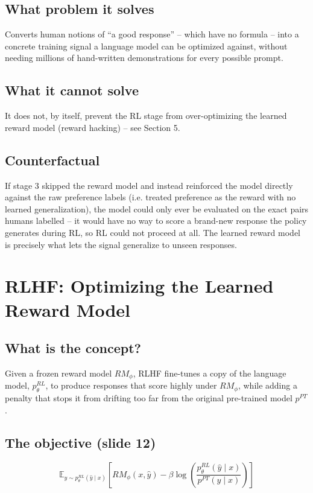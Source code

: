 \documentclass[11pt]{article}
\begin{document}
\subsection{What problem it solves}
Converts human notions of ``a good response'' -- which have no formula -- into a
concrete training signal a language model can be optimized against, without
needing millions of hand-written demonstrations for every possible prompt.

\subsection{What it cannot solve}
It does not, by itself, prevent the RL stage from over-optimizing the learned
reward model (reward hacking) -- see Section 5.

\subsection{Counterfactual}
If stage 3 skipped the reward model and instead reinforced the model directly
against the raw preference labels (i.e. treated preference as the reward with no
learned generalization), the model could only ever be evaluated on the exact
pairs humans labelled -- it would have no way to score a brand-new response the
policy generates during RL, so RL could not proceed at all. The learned reward
model is precisely what lets the signal generalize to unseen responses.

\section{RLHF: Optimizing the Learned Reward Model}

\subsection{What is the concept?}
Given a frozen reward model $RM_\phi$, RLHF fine-tunes a copy of the language
model, $p^{RL}_\theta$, to produce responses that score highly under $RM_\phi$,
while adding a penalty that stops it from drifting too far from the original
pre-trained model $p^{PT}$.

\subsection{The objective (slide 12)}
\[
\mathbb{E}_{\hat y \sim p^{RL}_\theta(\hat y \mid x)}
\left[RM_\phi(x,\hat y) - \beta \log\left(\frac{p^{RL}_\theta(\hat y \mid
x)}{p^{PT}(\hat y \mid x)}\right)\right]
\]
\end{document}

